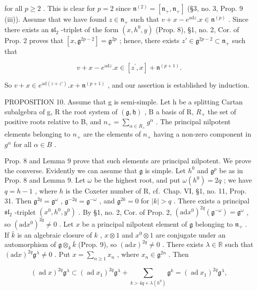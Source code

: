 for all \(p \geq 2\) . This is clear for \(p = 2\) since \(\mathfrak{n}^{(2)} = [\mathfrak{n}_+, \mathfrak{n}_+]\) (§3, no. 3, Prop. 9 (iii)). Assume that we have found \(z \in \mathfrak{n}_+\) such that \(v + x - e^{\mathrm{ad}z}.x \in \mathfrak{n}^{(p)}\) . Since there exists an \(\mathfrak{sl}_2\) -triplet of the form \((x, h^0, y)\) (Prop. 8), §1, no. 2, Cor. of Prop. 2 proves that \([x, \mathfrak{g}^{2p-2}] = \mathfrak{g}^{2p}\) ; hence, there exists \(z' \in \mathfrak{g}^{2p-2} \subset \mathfrak{n}_+\) such that

\[
v + x - e ^ {\mathrm{ad} z}. x \in [ z ^ {\prime}, x ] + \mathfrak {n} ^ {(p + 1)}.
\]

So \(v + x \in e^{\mathrm{ad}(z + z')}.x + \mathfrak{n}^{(p + 1)}\) , and our assertion is established by induction.

PROPOSITION 10. Assume that g is semi-simple. Let h be a splitting Cartan subalgebra of g, R the root system of \((\mathfrak{g},\mathfrak{h})\) , B a basis of R, \(R_{+}\) the set of positive roots relative to B, and \(n_{+}=\sum_{\alpha\in R_{+}}g^{\alpha}\) . The principal nilpotent elements belonging to \(n_{+}\) are the elements of \(n_{+}\) having a non-zero component in \(g^{\alpha}\) for all \(\alpha\in B\) .

Prop. 8 and Lemma 9 prove that such elements are principal nilpotent. We prove the converse. Evidently we can assume that \(\mathfrak{g}\) is simple. Let \(h^0\) and \(\mathfrak{g}^p\) be as in Prop. 8 and Lemma 9. Let \(\omega\) be the highest root, and put \(\omega(h^0) = 2q\) ; we have \(q = h - 1\) , where \(h\) is the Coxeter number of R, cf.~Chap. VI, §1, no. 11, Prop. 31. Then \(\mathfrak{g}^{2q} = \mathfrak{g}^\omega\) , \(\mathfrak{g}^{-2q} = \mathfrak{g}^{-\omega}\) , and \(\mathfrak{g}^{2k} = 0\) for \(|k| > q\) . There exists a principal \(\mathfrak{sl}_2\) -triplet \((x^0, h^0, y^0)\) . By §1, no. 2, Cor. of Prop. 2, \((\mathrm{ad} x^0)^{2q}(\mathfrak{g}^{-\omega}) = \mathfrak{g}^\omega\) , so \((\mathrm{ad} x^0)^{2q} \neq 0\) . Let \(x\) be a principal nilpotent element of \(\mathfrak{g}\) belonging to \(\mathfrak{n}_+\) . If \(\bar{k}\) is an algebraic closure of \(k\) , \(x \otimes 1\) and \(x^0 \otimes 1\) are conjugate under an automorphism of \(\mathfrak{g} \otimes_k \bar{k}\) (Prop. 9), so \((\mathrm{ad} x)^{2q} \neq 0\) . There exists \(\lambda \in \mathbb{R}\) such that \((\mathrm{ad} x)^{2q} \mathfrak{g}^\lambda \neq 0\) . Put \(x = \sum_{n \geq 1} x_n\) , where \(x_n \in \mathfrak{g}^{2n}\) . Then

\[
(\operatorname{ad} x) ^ {2 q} \mathfrak {g} ^ {\lambda} \subset (\operatorname{ad} x _ {1}) ^ {2 q} \mathfrak {g} ^ {\lambda} + \sum_ {k > 4 q + \lambda (h ^ {0})} \mathfrak {g} ^ {k} = (\operatorname{ad} x _ {1}) ^ {2 q} \mathfrak {g} ^ {\lambda},
\]

